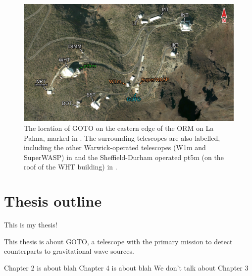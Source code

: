 \begin{colsection}
\begin{colsection}
\begin{figure}[p]
    \begin{center}
        \includegraphics[width=\linewidth]{images/orm_east_labelled.png}
    \end{center}
    \caption[The location of GOTO on La Palma]{
        The location of GOTO on the eastern edge of the ORM on La Palma, marked in . The surrounding telescopes are also labelled, including the other Warwick-operated telescopes (W1m and SuperWASP) in  and the Sheffield-Durham operated pt5m (on the roof of the WHT building) in .
    }\label{fig:orm_east}
\end{figure}

\clearpage

\end{colsection}


\end{colsection}


\newpage
\section{Thesis outline}
\label{sec:outline}
\begin{colsection}


This is my thesis!

This thesis is about GOTO, a telescope with the primary mission to detect counterparts to gravitational wave sources.

Chapter 2 is about blah
Chapter 4 is about blah
We don't talk about Chapter 3

\end{colsection}

